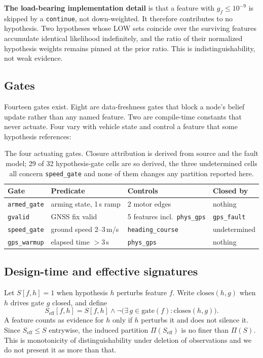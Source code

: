 \documentclass[11pt,a4paper]{article}
\newcommand{\code}[1]{\texttt{\small #1}}
\begin{document}
\textbf{The load-bearing implementation detail} is that a feature with
$g_f \le 10^{-9}$ is skipped by a \code{continue}, not down-weighted. It
therefore contributes to no hypothesis. Two hypotheses whose LOW sets coincide
over the surviving features accumulate identical likelihood indefinitely, and
the ratio of their normalized hypothesis weights remains pinned at the
prior ratio. This is
indistinguishability, not weak evidence.

\subsection{Gates}

Fourteen gates exist. Eight are data-freshness gates that block a node's
belief update rather than any named feature. Two are compile-time constants
that never actuate. Four vary with vehicle state and control a feature that
some hypothesis references:

\begin{table}[h]
\centering
\small
\begin{tabular}{llll}
\toprule
Gate & Predicate & Controls & Closed by \\
\midrule
\code{armed\_gate} & arming state, 1\,s ramp & 2 motor edges & nothing \\
\code{gvalid} & GNSS fix valid & 5 features incl.\ \code{phys\_gps} &
  \code{gps\_fault} \\
\code{speed\_gate} & ground speed 2--3\,m/s & \code{heading\_course} &
  undetermined \\
\code{gps\_warmup} & elapsed time $>3$\,s & \code{phys\_gps} & nothing \\
\bottomrule
\end{tabular}
\caption{The four actuating gates. Closure attribution is derived from source
and the fault model; 29 of 32 hypothesis-gate cells are so derived, the three
undetermined cells all concern \code{speed\_gate} and none of them changes any
partition reported here.}
\end{table}

\subsection{Design-time and effective signatures}

Let $S[f,h]=1$ when hypothesis $h$ perturbs feature $f$. Write
$\mathrm{closes}(h,g)$ when $h$ drives gate $g$ closed, and define
\begin{equation}
S_{\mathrm{eff}}[f,h] = S[f,h] \wedge
\neg\big(\exists\, g \in \mathrm{gate}(f) : \mathrm{closes}(h,g)\big).
\label{eq:seff}
\end{equation}
A feature counts as evidence for $h$ only if $h$ perturbs it and does not
silence it. Since $S_{\mathrm{eff}} \le S$ entrywise, the induced partition
$\Pi(S_{\mathrm{eff}})$ is no finer than $\Pi(S)$. This is monotonicity of
distinguishability under deletion of observations and we do not present it as
more than that.
\end{document}
